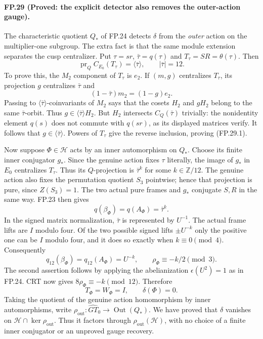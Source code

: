 \paragraph{FP.29 (Proved: the explicit detector also removes the outer-action gauge).}
The characteristic quotient $Q_*$ of FP.24 detects $\delta$ from the
\emph{outer} action on the multiplier-one subgroup. The extra fact is
that the same module extension separates the cusp centralizer. Put
$\tau=sr$, $\bar\tau=q(\tau)$ and $T_\tau=SR=\theta(\tau)$.
Then
\[
 \operatorname{pr}_Q C_{E_0}(T_\tau)=\langle\bar\tau\rangle,
 \qquad |\bar\tau|=12.
 \tag{FP.29.1}
\]
To prove this, the $M_2$ component of $T_\tau$ is $e_2$.
If $(m,g)$ centralizes $T_\tau$, its projection $g$ centralizes
$\bar\tau$ and
\[
 (1-\bar\tau)m_2=(1-g)e_2.
\]
Passing to $\langle\bar\tau\rangle$-coinvariants of $M_2$ says that
the cosets $H_2$ and $gH_2$ belong to the same $\bar\tau$-orbit.
Thus $g\in\langle\bar\tau\rangle H_2$. But $H_2$ intersects
$C_Q(\bar\tau)$ trivially: the nonidentity element $q(s)$ does not
commute with $q(sr)$, as its displayed matrices verify. It follows
that $g\in\langle\bar\tau\rangle$. Powers of $T_\tau$ give the
reverse inclusion, proving (FP.29.1).

Now suppose $\Phi\in\mathcal H$ acts by an inner automorphism on
$Q_*$. Choose its finite inner conjugator $g_*$. Since the genuine
action fixes $\tau$ literally, the image of $g_*$ in $E_0$ centralizes
$T_\tau$. Thus its $Q$-projection is $\bar\tau^k$ for some
$k\in\mathbb Z/12$. The genuine action also fixes the permutation
quotient $S_3$ pointwise; hence that projection is pure, since
$Z(S_3)=1$. The two actual pure frames and $g_*$ conjugate $S,R$ in
the same way. FP.23 then gives
\[
 q(\beta_\Phi)=q(A_\Phi)=\bar\tau^k.
\]
In the signed matrix normalization, $\bar\tau$ is represented by
$U^{-1}$. The actual frame lifts are $I$ modulo four. Of the two
possible signed lifts $\pm U^{-k}$ only the positive one can be $I$
modulo four, and it does so exactly when $k\equiv0\pmod4$.
Consequently
\[
 q_{12}(\beta_\Phi)=q_{12}(A_\Phi)=U^{-k},\qquad
 \rho_\Phi\equiv-k/2\pmod3.
\]
The second assertion follows by applying the abelianization
$\epsilon(U^2)=1$ as in FP.24. CRT now gives
$8\rho_\Phi\equiv-k\pmod{12}$. Therefore
\[
 T_\Phi=W_\Phi=I,\qquad\delta(\Phi)=0.
 \tag{FP.29.2}
\]
Taking the quotient of the genuine action homomorphism by inner
automorphisms, write
$\rho_{\mathrm{out}}:\widehat{GT}_0\to\operatorname{Out}(Q_*)$.
We have proved that $\delta$ vanishes on
$\mathcal H\cap\ker\rho_{\mathrm{out}}$. Thus it factors through
$\rho_{\mathrm{out}}(\mathcal H)$, with no choice of a finite inner
conjugator or an unproved gauge recovery.

